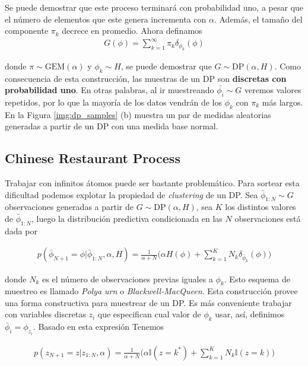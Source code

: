\documentclass[letterpaper,12pt,oneside]{book} %
\begin{document}
Se puede demostrar que este proceso terminará con probabilidad uno, a pesar que el número de elementos que este genera incrementa con $\alpha$. Además, el tamaño del componente $\pi_{k}$ decrece en promedio. Ahora definamos 
\begin{align}
    G(\phi) = \sum_{k=1}^{\infty}\pi_{k}\delta_{\phi_{k}}(\phi)
\end{align}

donde $\pi \sim \text{GEM}(\alpha)$ y $\phi_{k} \sim H$, se puede demostrar que $G \sim \text{DP}(\alpha, H)$. Como consecuencia de esta construcción, las muestras de un DP son \textbf{discretas con probabilidad uno}. En otras palabras, al ir muestreando $\bar{\phi_{i}}\sim G$ veremos valores repetidos, por lo que la mayoría de los datos vendrán de los $\phi_{k}$ con $\pi_{k}$ más largos. En la Figura \ref{img:dp_samples} (b) muestra un par de medidas aleatorias generadas a partir de un DP con una medida base normal.\\


\subsection{Chinese Restaurant Process}
\label{sec:crp}

Trabajar con infinitos átomos puede ser bastante problemático. Para sortear esta dificultad podemos explotar la propiedad de \textit{clustering} de un DP. Sea $\bar{\phi}_{1:N}\sim G$ observaciones generadas a partir de $G\sim \text{DP}(\alpha, H)$, sea $K$ los distintos valores de $\bar{\phi}_{1:N}$, luego la distribución predictiva condicionada en las $N$ observaciones está dada por

\begin{align}
p(\bar{\phi}_{N+1}=\phi|\bar{\phi}_{1:N}, \alpha, H) = \frac{1}{\alpha+N}\bigg(\alpha H(\phi)+\sum_{k=1}^{K}N_{k}\delta_{\bar{\phi}_{k}}(\phi)\bigg)
\end{align}

donde $N_{k}$ es el número de observaciones previas iguales a $\phi_{k}$. Esto esquema de muestreo es llamado \textit{Polya urn} o \textit{Blackwell-MacQueen}. Esta construcción provee una forma constructiva para muestrear de un DP. Es más conveniente trabajar con variables discretas $z_{i}$ que especifican cual valor de $\phi_{k}$ usar, así, definimos $\bar{\phi}_{i}=\phi_{z_{i}}$. Basado en esta expresión Tenemos

\begin{align}
p(z_{N+1}=z|z_{1:N}, \alpha) = \frac{1}{\alpha+N}\bigg(\alpha\mathbb{I}(z=k^{*})+\sum_{k=1}^{K}N_{k}\mathbb{I}(z=k)\bigg)
\end{align}
\end{document}
